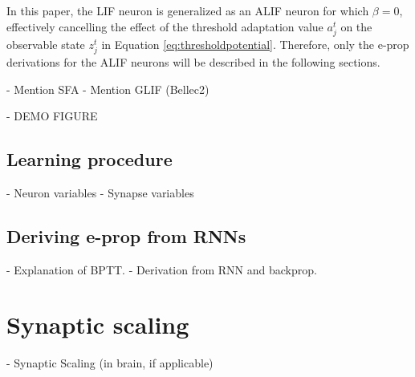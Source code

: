         In this paper, the LIF neuron is generalized as an ALIF neuron for which $\beta=0$, effectively cancelling the effect of the threshold adaptation value $a^t_j$ on the observable state $z^t_j$ in Equation \ref{eq:thresholdpotential}.
        Therefore, only the e-prop derivations for the ALIF neurons will be described in the following sections.

        \begin{tcolorbox}[colback=orange]
        - Mention SFA
          - Mention GLIF (Bellec2)
        \vspace{5cm}

        \end{tcolorbox}
        \begin{tcolorbox}[colback=orange]
        - DEMO FIGURE
        \vspace{10cm}

        \end{tcolorbox}

    \subsection{Learning procedure}

        \begin{tcolorbox}[colback=orange]
        - Neuron variables
        - Synapse variables

        \vspace{20cm}

        \end{tcolorbox}

    \subsection{Deriving e-prop from RNNs}

        \begin{tcolorbox}[colback=orange]
        - Explanation of BPTT.
        - Derivation from RNN and backprop.
        \vspace{20cm}

        \end{tcolorbox}

\section{Synaptic scaling}

    \begin{tcolorbox}[colback=orange]
    - Synaptic Scaling (in brain, if applicable)
    \vspace{10cm}

    \end{tcolorbox}


